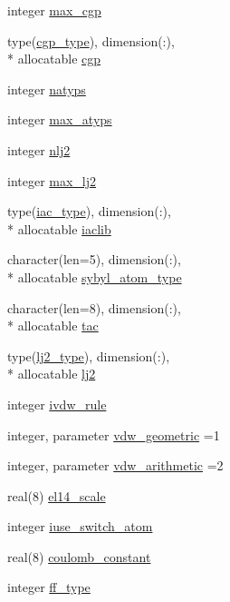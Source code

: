 \begin{DoxyCompactItemize}
integer \hyperlink{classtopo_af211ad4f3cda0669a497f1e0f2ab3f5e}{max\-\_\-cgp}
\item 
type(\hyperlink{structtopo_1_1cgp__type}{cgp\-\_\-type}), dimension(\-:), \\*
allocatable \hyperlink{classtopo_a14c15995f0c51e3f476a707dacdb8325}{cgp}
\item 
integer \hyperlink{classtopo_aa2c6ab1859a6c008f5b356dbaa530d07}{natyps}
\item 
integer \hyperlink{classtopo_ad992e655380f152361aa9d351c59a9f6}{max\-\_\-atyps}
\item 
integer \hyperlink{classtopo_a3e9ae63a574e391f4273239d99cde7dc}{nlj2}
\item 
integer \hyperlink{classtopo_afa9d4e5525b6c87435e9203dbedd00e9}{max\-\_\-lj2}
\item 
type(\hyperlink{structtopo_1_1iac__type}{iac\-\_\-type}), dimension(\-:), \\*
allocatable \hyperlink{classtopo_ac0d4a792e1df748bab4c64c116767f36}{iaclib}
\item 
character(len=5), dimension(\-:), \\*
allocatable \hyperlink{classtopo_a54b45b6eb47a65ecff972da7e73e7ffe}{sybyl\-\_\-atom\-\_\-type}
\item 
character(len=8), dimension(\-:), \\*
allocatable \hyperlink{classtopo_a61a2ce9eb3fbc2b8c978de51e0c8c232}{tac}
\item 
type(\hyperlink{structtopo_1_1lj2__type}{lj2\-\_\-type}), dimension(\-:), \\*
allocatable \hyperlink{classtopo_a5edb99fd66ebc120dc55c764018389a1}{lj2}
\item 
integer \hyperlink{classtopo_aecebb95712ccb5cb3945600dccbd9721}{ivdw\-\_\-rule}
\item 
integer, parameter \hyperlink{classtopo_a7c8bd17bbabb36ba8f438e50e503d6b7}{vdw\-\_\-geometric} =1
\item 
integer, parameter \hyperlink{classtopo_a62176dc452e3f5a13dff7365a45edfb6}{vdw\-\_\-arithmetic} =2
\item 
real(8) \hyperlink{classtopo_aceb0d764eb03b4b14e013f791b20210c}{el14\-\_\-scale}
\item 
integer \hyperlink{classtopo_a2d534e5252ccf0786f939d8cacdb8d1f}{iuse\-\_\-switch\-\_\-atom}
\item 
real(8) \hyperlink{classtopo_a5d5c22c48d2fd1140ed5943ce44f0192}{coulomb\-\_\-constant}
\item 
integer \hyperlink{classtopo_a3ecd180b85daedebf2f6fa7b4e8046e4}{ff\-\_\-type}

\end{DoxyCompactItemize}
